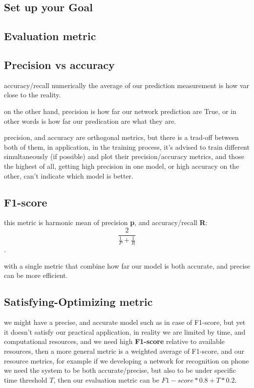 \documentclass[4apaper,12pt]{book}
\begin{document}
\begin{description}
    \section{Set up your Goal}
    \begin{description}
      \subsection{Evaluation metric}
      \subsection{Precision vs accuracy}
    \item accuracy/recall numerically the average of our prediction measurement is how var close to the reality.
    \item on the other hand, precision is how far our network prediction are True, or in other words is how far our predication are what they are.
    \item precision, and accuracy are orthogonal metrics, but there is a trad-off between both of them, in application, in the training process, it's advised to train different simultaneously (if possible) and plot their precision/accuracy metrics, and those the highest of all, getting high precision in one model, or high accuracy on the other, can't indicate which model is better.
      \subsection {F1-score}
    \item this metric is harmonic mean of precision \textbf{p}, and accuracy/recall \textbf{R}: $$\frac{2}{\frac{1}{P} + \frac{1}{R}}$$.
    \item with a single metric that combine how far our model is both accurate, and precise can be more efficient.
      \subsection {Satisfying-Optimizing metric}
      \item we might have a precise, and accurate model such as in case of F1-score, but yet it doesn't satisfy our practical application, in reality we are limited by time, and computational resources, and we need high \textbf{F1-score} relative to available resources, then a more general metric is a weighted average of F1-score, and our resource metrics, for example if we developing a network for recognition on phone we need the system to be both accurate/precise, but also to be under specific time threshold $T$, then our evaluation metric can be $F1-score*0.8+T*0.2$.
    \end{description}

\end{description}
\end{document}
